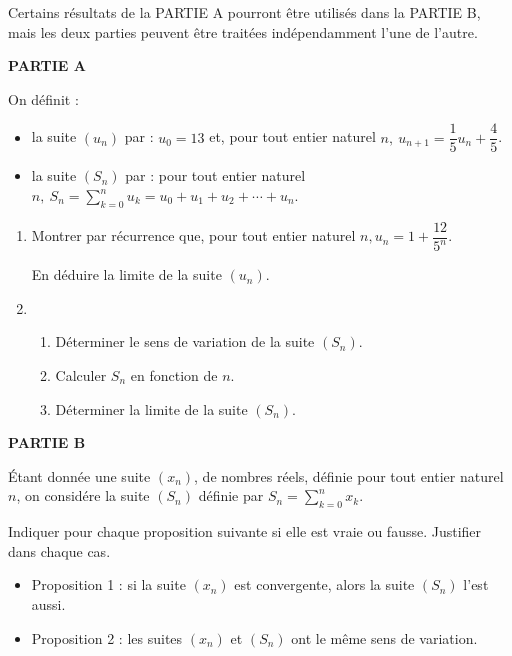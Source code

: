 \documentclass[a4paper,11pt,DIV12,BCOR0mm]{scrartcl}
\begin{document}
\begin{exercice}
 Certains résultats de la PARTIE A pourront être utilisés dans la PARTIE B, mais les deux parties peuvent être traitées indépendamment l'une de l'autre. 

\medskip

\noindent \textbf{PARTIE A }
  
\noindent On définit :
\begin{itemize}
\item la suite $\left(u_{n}\right)$ par : $u_{0} = 13$ et, pour tout entier naturel $n,~ u_{n+1}  = \dfrac{1}{5}u_{n} +\dfrac{4}{5}$. 
\item la suite $\left(S_{n}\right)$ par : pour tout entier naturel $n,~ S_{n} = \displaystyle\sum_{k=0}^n u_{k} =  u_{0} +u_{1} +u_{2} + \cdots + u_{n}$.
\end{itemize}
\begin{enumerate}
\item  Montrer par récurrence que, pour tout entier naturel $n, u_{n} =  1 + \dfrac{12}{5^n}$.  

En déduire la limite de la suite $\left(u_{n}\right)$. 
\item  
	\begin{enumerate}
		\item  Déterminer le sens de variation de la suite $\left(S_{n}\right)$. 
		\item Calculer $S_{n}$ en fonction de $n$. 
		\item Déterminer la limite de la suite $\left(S_{n}\right)$. 
	\end{enumerate}
\end{enumerate}

\medskip

\noindent\textbf{PARTIE B }
 
\noindent\'Etant donnée une suite $\left(x_{n}\right)$, de nombres réels, 
définie pour tout entier naturel $n$, on considére la suite $\left(S_{n}\right)$ 
définie par $S_{n} =  \displaystyle\sum_{k=0}^n x_{k}$.
 
\noindent Indiquer pour chaque proposition suivante si elle est vraie ou fausse.
 Justifier dans chaque cas. 

\begin{itemize}
\item[] Proposition 1 : si la suite $\left(x_{n}\right)$ est convergente, alors la suite $\left(S_{n}\right)$ l'est aussi. 
\item[] Proposition 2 : les suites $\left(x_{n}\right)$ et $\left(S_{n}\right)$ ont le même sens de variation. 
\end{itemize}
\end{exercice}
\end{document}

